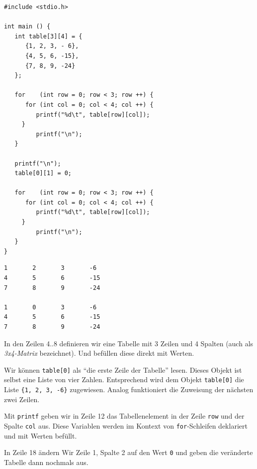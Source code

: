 \begin{codebox}
\begin{verbatim}
#include <stdio.h>

int main () {
   int table[3][4] = {
      {1, 2, 3, - 6},
      {4, 5, 6, -15},
      {7, 8, 9, -24}
   };
   
   for    (int row = 0; row < 3; row ++) {
      for (int col = 0; col < 4; col ++) {
         printf("%d\t", table[row][col]);
     }
         printf("\n");
   }
   
   printf("\n");
   table[0][1] = 0;
   
   for    (int row = 0; row < 3; row ++) {
      for (int col = 0; col < 4; col ++) {
         printf("%d\t", table[row][col]);
     }
         printf("\n");
   }
}
\end{verbatim}
\end{codebox}

\begin{cmdbox}
\begin{verbatim}
1       2       3       -6
4       5       6       -15
7       8       9       -24

1       0       3       -6
4       5       6       -15
7       8       9       -24
\end{verbatim}
\end{cmdbox}

In den Zeilen 4..8 definieren wir eine Tabelle mit 3 Zeilen und 4 Spalten (auch als \emph{3x4-Matrix} bezeichnet). Und befüllen diese direkt mit Werten. 

Wir können \texttt{table[0]} als \enquote{die erste Zeile der Tabelle} lesen. Dieses Objekt ist selbst eine Liste von vier Zahlen. Entsprechend wird dem Objekt \texttt{table[0]} die Liste \texttt{\{1, 2, 3, -6\}} zugewiesen. Analog funktioniert die Zuweisung der nächsten zwei Zeilen.

Mit \texttt{printf} geben wir in Zeile 12 das Tabellenelement in der Zeile \texttt{row} und der Spalte \texttt{col} aus. Diese Variablen werden im Kontext von \texttt{for}-Schleifen deklariert und mit Werten befüllt.

In Zeile 18 ändern Wir Zeile 1, Spalte 2 auf den Wert \texttt{0} und geben die veränderte Tabelle dann nochmals aus.

